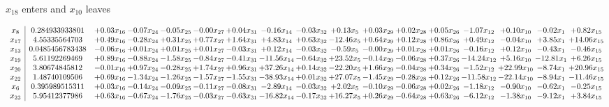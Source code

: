 \documentclass[9pt]{article}
\begin{document}
 $ x_{18} $ enters and $ x_{10} $ leaves 

 \[\begin{array}{c| c c@{\hskip 2pt} c@{\hskip 2pt} c@{\hskip 2pt} c@{\hskip 2pt} c@{\hskip 2pt} c@{\hskip 2pt} c@{\hskip 2pt} c@{\hskip 2pt} c@{\hskip 2pt} c@{\hskip 2pt} c@{\hskip 2pt} c@{\hskip 2pt} c@{\hskip 2pt} c@{\hskip 2pt} c@{\hskip 2pt} }
 x_{8}   &  0.284933933801 & +  0.03 x_{16} & -0.07 x_{24} & -0.05 x_{25} & -0.00 x_{27} & +  0.04 x_{31} & -0.16 x_{14} & -0.03 x_{32} & +  0.13 x_{5} & +  0.03 x_{29} & +  0.02 x_{28} & +  0.05 x_{26} & -1.07 x_{12} & +  0.10 x_{10} & -0.02 x_{1} & +  0.82 x_{15}\\
 x_{17}   &  4.55335564703 & +  0.49 x_{16} & -0.28 x_{24} & +  0.31 x_{25} & +  0.77 x_{27} & +  1.64 x_{31} & +  4.83 x_{14} & +  0.63 x_{32} & -12.46 x_{5} & +  0.64 x_{29} & +  0.12 x_{28} & +  0.86 x_{26} & +  0.49 x_{12} & -0.04 x_{10} & +  3.85 x_{1} & + 14.06 x_{15}\\
 x_{13}   &  0.0485456783438 & -0.06 x_{16} & +  0.01 x_{24} & +  0.01 x_{25} & +  0.01 x_{27} & -0.03 x_{31} & +  0.12 x_{14} & -0.03 x_{32} & -0.59 x_{5} & -0.00 x_{29} & +  0.01 x_{28} & +  0.01 x_{26} & -0.16 x_{12} & +  0.12 x_{10} & -0.43 x_{1} & -0.46 x_{15}\\
 x_{19}   &  5.61192269469 & +  0.89 x_{16} & -0.88 x_{24} & -1.58 x_{25} & -0.84 x_{27} & -0.41 x_{31} & -11.56 x_{14} & -0.64 x_{32} & + 23.52 x_{5} & -0.14 x_{29} & -0.06 x_{28} & +  0.37 x_{26} & -14.24 x_{12} & +  5.16 x_{10} & -12.81 x_{1} & +  6.26 x_{15}\\
 x_{20}   &  3.80674845812 & -0.01 x_{16} & +  0.97 x_{24} & -0.28 x_{25} & +  1.74 x_{27} & +  0.96 x_{31} & + 37.26 x_{14} & +  0.14 x_{32} & -22.20 x_{5} & +  1.66 x_{29} & -0.04 x_{28} & +  0.34 x_{26} & -1.52 x_{12} & + 22.99 x_{10} & -8.74 x_{1} & + 20.96 x_{15}\\
 x_{22}   &  1.48740109506 & +  0.69 x_{16} & -1.34 x_{24} & -1.26 x_{25} & -1.57 x_{27} & -1.55 x_{31} & -38.93 x_{14} & +  0.01 x_{32} & + 27.07 x_{5} & -1.45 x_{29} & -0.28 x_{28} & +  0.12 x_{26} & -11.58 x_{12} & -22.14 x_{10} & -8.94 x_{1} & -11.46 x_{15}\\
 x_{6}   &  0.395989515311 & +  0.03 x_{16} & -0.14 x_{24} & -0.09 x_{25} & -0.11 x_{27} & -0.08 x_{31} & -2.89 x_{14} & -0.03 x_{32} & +  2.02 x_{5} & -0.10 x_{29} & -0.06 x_{28} & +  0.02 x_{26} & -1.18 x_{12} & -0.90 x_{10} & -0.62 x_{1} & -0.25 x_{15}\\
 x_{23}   &  5.95412377986 & +  0.63 x_{16} & -0.67 x_{24} & -1.76 x_{25} & -0.03 x_{27} & -0.63 x_{31} & -16.82 x_{14} & -0.17 x_{32} & + 16.27 x_{5} & +  0.26 x_{29} & -0.64 x_{28} & +  0.63 x_{26} & -6.12 x_{12} & -1.38 x_{10} & -9.12 x_{1} & +  3.84 x_{15}\\

\end{array}\]
\end{document}
